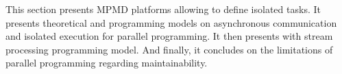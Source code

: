 

This section presents MPMD platforms allowing to define isolated tasks.
It presents theoretical and programming models on asynchronous communication and isolated execution for parallel programming.
It then presents with stream processing programming model.
And finally, it concludes on the limitations of parallel programming regarding maintainability. 








